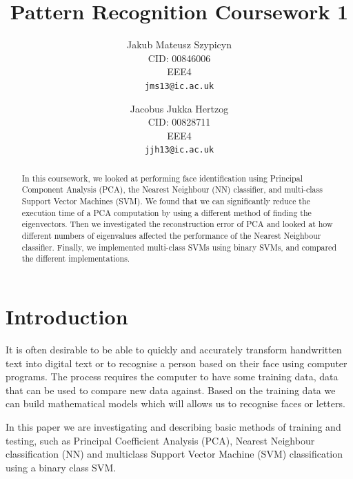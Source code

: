 \documentclass[10pt,twocolumn,letterpaper]{article}
\begin{document}
\title{Pattern Recognition Coursework 1}

\author{Jakub Mateusz Szypicyn\\
CID: 00846006\\
EEE4\\
{\tt\small jms13@ic.ac.uk}
\and
Jacobus Jukka Hertzog\\
CID: 00828711\\
EEE4\\
{\tt\small jjh13@ic.ac.uk}
}

\maketitle

\begin{abstract}
\vspace{-4mm}
In this coursework, we looked at performing face identification using Principal Component Analysis (PCA), the Nearest Neighbour (NN) classifier, and multi-class Support Vector Machines (SVM). We found that we can significantly reduce the execution time of a  PCA computation by using a different method of finding the eigenvectors. Then we investigated the reconstruction error of PCA and looked at how different numbers of eigenvalues affected the performance of the Nearest Neighbour classifier. Finally, we implemented multi-class SVMs using binary SVMs, and compared the different implementations.
\end{abstract}
\vspace{-5mm}
\section{Introduction}

It is often desirable to be able to quickly and accurately transform handwritten text into digital text or to recognise a person based on their face using computer programs. The process requires the computer to have some training data, data that can be used to compare new data against. Based on the training data we can build mathematical models which will allows us to recognise faces or letters.

In this paper we are investigating and describing basic methods of training and testing, such as Principal Coefficient Analysis (PCA), Nearest Neighbour classification (NN) and multiclass Support Vector Machine (SVM) classification using a binary class SVM. 
\end{document}
